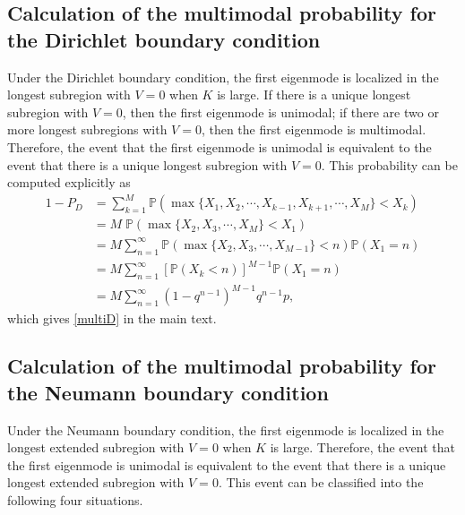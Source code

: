 \documentclass[a4paper,11pt]{article}
\begin{document}
\begin{appendices}
\subsection{Calculation of the multimodal probability for the Dirichlet boundary condition}\label{appB2}
Under the Dirichlet boundary condition, the first eigenmode is localized in the longest subregion with $V = 0$ when $K$ is large. If there is a unique longest subregion with $V = 0$, then the first eigenmode is unimodal; if there are two or more longest subregions with $V = 0$, then the first eigenmode is multimodal. Therefore, the event that the first eigenmode is unimodal is equivalent to the event that there is a unique longest subregion with $V = 0$. This probability can be computed explicitly as
\begin{equation*}
\begin{split}
1-P_D &= \sum_{k=1}^{M} \mathbb{P}(\max\{X_1, X_2, \cdots, X_{k-1}, X_{k+1}, \cdots, X_{M}\} < X_k) \\
&= M \; \mathbb{P}(\max\{X_{2}, X_{3}, \cdots, X_{M}\} < X_1) \\
&= M \sum_{n=1}^{\infty} \mathbb{P}(\max\{X_2, X_3, \cdots, X_{M-1}\} < n) \mathbb{P}(X_1 = n) \\
&= M \sum_{n=1}^{\infty} [\mathbb{P}(X_k < n)]^{M-1} \mathbb{P}(X_1 = n)\\
&= M \sum_{n=1}^{\infty} (1 - q^{n-1})^{M-1} q^{n-1} p,
\end{split}
\end{equation*}
which gives \eqref{multiD} in the main text.

\subsection{Calculation of the multimodal probability for the Neumann boundary condition}\label{appB3}
Under the Neumann boundary condition, the first eigenmode is localized in the longest extended subregion with $V = 0$ when $K$ is large. Therefore, the event that the first eigenmode is unimodal is equivalent to the event that there is a unique longest extended subregion with $V = 0$. This event can be classified into the following four situations.


\end{appendices}
\end{document}
